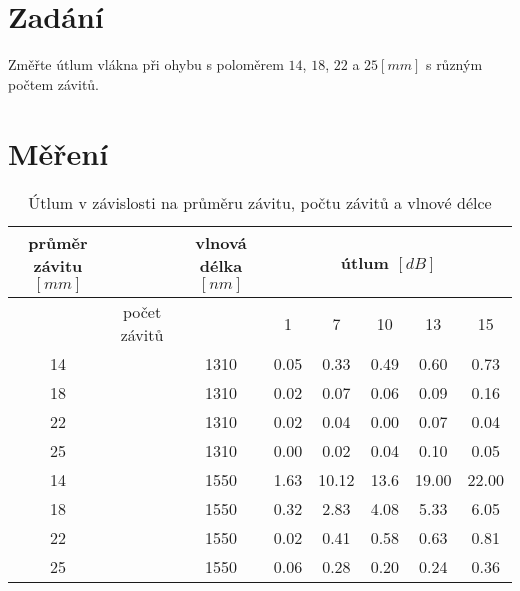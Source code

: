 \section{Zadání}
Změřte útlum vlákna při ohybu s poloměrem \(14\), \(18\), \(22\) a \(25 [mm]\) s různým počtem závitů.

\section{Měření}

\begin{table}[h]
    \centering
    \caption{Útlum v závislosti na průměru závitu, počtu závitů a vlnové délce}
    \begin{tabular}{|c|c|c|ccccc|}
        \hline
        průměr závitu \([mm]\) & & vlnová délka \([nm]\)    & \multicolumn{5}{c|}{útlum \([dB]\)}  \\ \hline
           & počet závitů & & 1    & 7      & 10    & 13    & 15                \\ \hline
        14 & & 1310         & 0.05 & 0.33   & 0.49  & 0.60  & 0.73              \\
        18 & & 1310         & 0.02 & 0.07   & 0.06  & 0.09  & 0.16              \\
        22 & & 1310         & 0.02 & 0.04   & 0.00  & 0.07  & 0.04              \\
        25 & & 1310         & 0.00 & 0.02   & 0.04  & 0.10  & 0.05              \\ \hline
        14 & & 1550         & 1.63 & 10.12  & 13.6  & 19.00 & 22.00             \\
        18 & & 1550         & 0.32 & 2.83   & 4.08  & 5.33  & 6.05              \\
        22 & & 1550         & 0.02 & 0.41   & 0.58  & 0.63  & 0.81              \\
        25 & & 1550         & 0.06 & 0.28   & 0.20  & 0.24  & 0.36              \\
        \hline
    \end{tabular}
\end{table}
